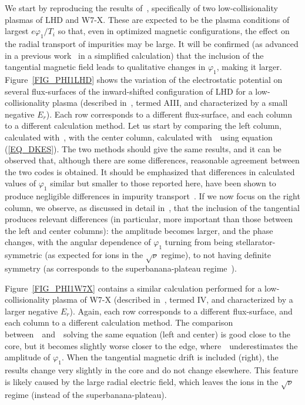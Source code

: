 We start by reproducing the results of~\citep{regana2017phi1}, specifically of two low-collisionality plasmas of LHD and W7-X.  These are expected to be the plasma conditions of largest $e\varphi_1/T_i$ so that, even in optimized magnetic configurations, the effect on the radial transport of impurities may be large. It will be confirmed (as advanced in a previous work~\citep{velasco2018phi1} in a simplified calculation) that the inclusion of the tangential magnetic field leads to qualitative changes in $\varphi_1$, making it larger. Figure~\ref{FIG_PHI1LHD} shows the variation of the electrostatic potential on several flux-surfaces of the inward-shifted configuration of LHD for a low-collisionality plasma (described in~\citep{regana2017phi1}, termed AIII, and characterized by a small negative $E_r$). Each row corresponds to a different flux-surface, and each column to a different calculation method. Let us start by comparing the left column, calculated with~\EUTERPE, with the center column, calculated with~\KNOSOS~using equation (\ref{EQ_DKES}). The two methods should give the same results, and it can be observed that, although there are some differences, reasonable agreement between the two codes is obtained. It should be emphasized that differences in calculated values of $\varphi_1$ similar but smaller to those reported here, have been shown to produce negligible differences in impurity transport~\citep{velasco2018phi1}. If we now focus on the right column, we observe, as discussed in detail in~\citep{velasco2018phi1}, that the inclusion of the tangential produces relevant differences (in particular, more important than those between the left and center columns): the amplitude becomes larger, and the phase changes, with the angular dependence of $\varphi_1$ turning from being stellarator-symmetric (as expected for ions in the $\sqrt{\nu}$ regime), to not having definite symmetry (as corresponds to the superbanana-plateau regime~\citep{calvo2018jpp}).

Figure~\ref{FIG_PHI1W7X} contains a similar calculation performed for a low-collisionality plasma of W7-X (described in~\citep{regana2017phi1}, termed IV, and characterized by a larger negative $E_r$). Again, each row corresponds to a different flux-surface, and each column to a different calculation method. The comparison between~\EUTERPE~and~\KNOSOS~solving the same equation (left and center) is good close to the core, but it becomes slightly worse closer to the edge, where~\KNOSOS~underestimates the amplitude of $\varphi_1$. When the tangential magnetic drift is included (right), the results change very slightly in the core and do not change elsewhere. This feature is likely caused by the large radial electric field, which leaves the ions in the $\sqrt{\nu}$ regime (instead of the superbanana-plateau).

